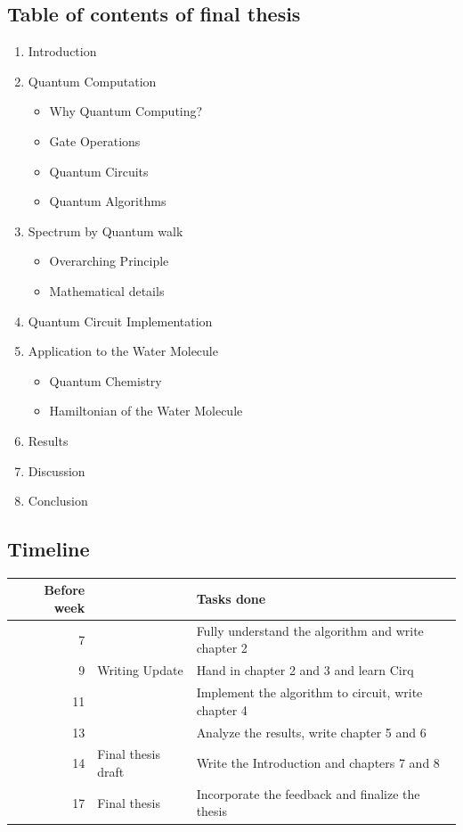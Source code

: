\documentclass{article}
\begin{document}
\newpage
\subsection{Table of contents of final thesis}

\begin{enumerate}
  \item Introduction
  \item Quantum Computation
  \begin{itemize}
    \item Why Quantum Computing?
    \item Gate Operations
    \item Quantum Circuits
    \item Quantum Algorithms
  \end{itemize}
  \item Spectrum by Quantum walk
  \begin{itemize}
    \item Overarching Principle
    \item Mathematical details
  \end{itemize}
  \item Quantum Circuit Implementation
  \item Application to the Water Molecule
  \begin{itemize}
    \item Quantum Chemistry
    \item Hamiltonian of the Water Molecule
  \end{itemize}
  \item Results
  \item Discussion
  \item Conclusion
\end{enumerate}

\subsection{Timeline}

\begin{table}[h]
\centering
\begin{tabular}{rll}
Before week &  & Tasks done  \\
\hline
7 & & Fully understand the algorithm and write chapter 2           \\
9 & Writing Update & Hand in chapter 2 and 3 and learn Cirq          \\
11 && Implement the algorithm to circuit, write chapter 4           \\
13 && Analyze the results, write chapter 5 and 6          \\
14 &Final thesis draft         & Write the Introduction and chapters 7 and 8         \\
17 &Final thesis         & Incorporate the feedback and finalize the thesis          \\

\end{tabular}
\end{table}

\nocite{reiher}
\nocite{nielsen}
\nocite{bian}

\printbibliography
\end{document}
